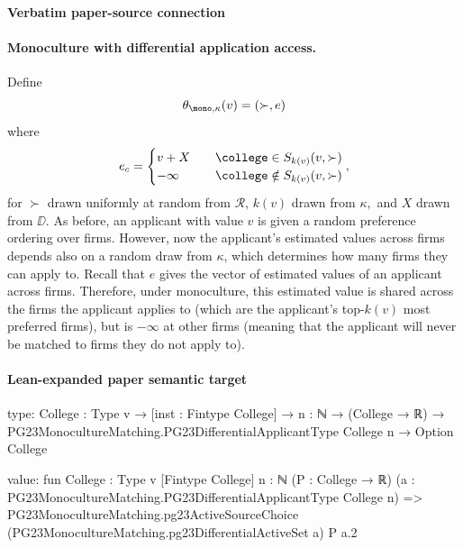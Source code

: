 \documentclass[10pt]{article}
\begin{document}
\paragraph{Verbatim paper-source connection}
\begin{ReviewVerbatim}
\paragraph{Monoculture with differential application access.} Define
\begin{equation}
    \theta_{\mono, \kappa}(v) = (\succ, e)
\end{equation}
where
\begin{equation}
    e_c =
    \begin{cases}
        v + X &\quad \college\in S_{k(v)}(v, \succ)\\
        -\infty &\quad \college\notin S_{k(v)}(v, \succ)
    \end{cases},
\end{equation}
for $\succ$ drawn uniformly at random from $\mathcal{R}$, $k(v)$ drawn from $\kappa,$ and $X$ drawn from $\DD$. As before, an applicant with value $v$ is given a random preference ordering over firms. However, now the applicant's estimated values across firms depends also on a random draw from $\kappa$, which determines how many firms they can apply to. Recall that $e$ gives the vector of estimated values of an applicant across firms. Therefore, under monoculture, this estimated value is shared across the firms the applicant applies to (which are the applicant's top-$k(v)$ most preferred firms), but is $-\infty$ at other firms (meaning that the applicant will never be matched to firms they do not apply to).
\end{ReviewVerbatim}



\paragraph{Lean-expanded paper semantic target}
\begin{ReviewVerbatim}
type:
{College : Type v} →
  [inst : Fintype College] →
    {n : ℕ} → (College → ℝ) → PG23MonocultureMatching.PG23DifferentialApplicantType College n → Option College

value:
fun {College : Type v} [Fintype College] {n : ℕ} (P : College → ℝ)
    (a : PG23MonocultureMatching.PG23DifferentialApplicantType College n) =>
  PG23MonocultureMatching.pg23ActiveSourceChoice (PG23MonocultureMatching.pg23DifferentialActiveSet a) P a.2
\end{ReviewVerbatim}
\end{document}
